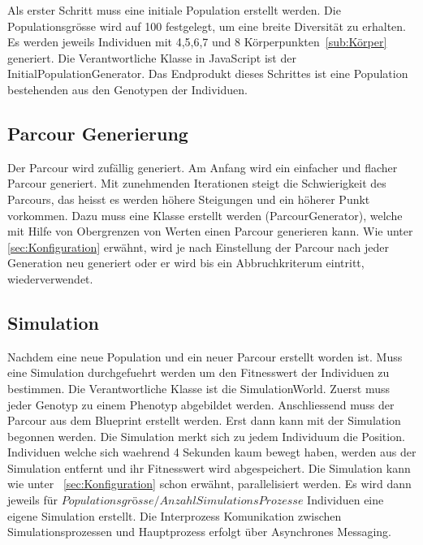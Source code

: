       Als erster Schritt muss eine initiale Population erstellt werden. Die Populationsgrösse wird auf 100 festgelegt,
      um eine breite Diversität zu erhalten.
      Es werden jeweils Individuen mit 4,5,6,7 und 8 Körperpunkten~\ref{sub:Körper} generiert.
      Die Verantwortliche Klasse in JavaScript ist der InitialPopulationGenerator.
      Das Endprodukt dieses Schrittes ist eine Population bestehenden aus den Genotypen der Individuen.

    \subsection{Parcour Generierung\label{sec:Parcour Generierung}}

      Der Parcour wird zufällig generiert. Am Anfang wird ein einfacher und flacher Parcour generiert.
      Mit zunehmenden Iterationen steigt die Schwierigkeit des Parcours, das heisst es werden höhere Steigungen und ein höherer Punkt vorkommen.
      Dazu muss eine Klasse erstellt werden (ParcourGenerator), welche mit Hilfe von Obergrenzen von Werten einen Parcour generieren kann.
      Wie unter \ref{sec:Konfiguration} erwähnt, wird je nach Einstellung der Parcour nach jeder Generation neu generiert oder er wird bis ein Abbruchkriterum
      eintritt, wiederverwendet.

    \subsection{Simulation}
      Nachdem eine neue Population und ein neuer Parcour erstellt worden ist.
      Muss eine Simulation durchgefuehrt werden um den Fitnesswert der Individuen zu bestimmen.
      Die Verantwortliche Klasse ist die SimulationWorld. Zuerst muss jeder Genotyp zu einem Phenotyp abgebildet werden.
      Anschliessend muss der Parcour aus dem Blueprint erstellt werden. Erst dann kann mit der Simulation begonnen werden.
      Die Simulation merkt sich zu jedem Individuum die Position. Individuen welche sich waehrend 4 Sekunden kaum bewegt haben,
      werden aus der Simulation entfernt und ihr Fitnesswert wird abgespeichert.
      Die Simulation kann wie unter ~\ref{sec:Konfiguration} schon erwähnt, parallelisiert werden. Es wird dann jeweils für
      \( Populationsgrösse / Anzahl Simulations Prozesse \) Individuen eine eigene Simulation erstellt. Die Interprozess Komunikation
      zwischen Simulationsprozessen und Hauptprozess erfolgt über Asynchrones Messaging.

